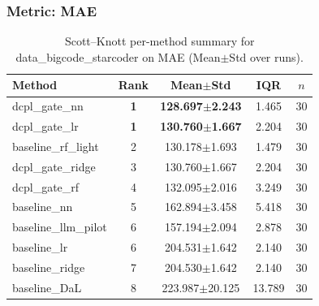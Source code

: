 \subsubsection*{Metric: MAE}
\begin{table}[H]
\centering
\scriptsize
\setlength{\tabcolsep}{4pt}
\renewcommand{\arraystretch}{1.1}
\caption{Scott--Knott per-method summary for data\_bigcode\_starcoder on MAE (Mean$\pm$Std over runs).}
\label{tab:sk_data_bigcode_starcoder_MAE}
\begin{tabular}{l|c|c|c|c}
\hline
\textbf{Method} & \textbf{Rank} & \textbf{Mean$\pm$Std} & \textbf{IQR} & \textbf{$n$} \\
\hline
\rowcolor{red!15} dcpl\_gate\_nn & \textbf{1} & \textbf{128.697$\pm$2.243} & 1.465 & 30 \\
\rowcolor{red!15} dcpl\_gate\_lr & \textbf{1} & \textbf{130.760$\pm$1.667} & 2.204 & 30 \\
baseline\_rf\_light & 2 & 130.178$\pm$1.693 & 1.479 & 30 \\
dcpl\_gate\_ridge & 3 & 130.760$\pm$1.667 & 2.204 & 30 \\
dcpl\_gate\_rf & 4 & 132.095$\pm$2.016 & 3.249 & 30 \\
baseline\_nn & 5 & 162.894$\pm$3.458 & 5.418 & 30 \\
baseline\_llm\_pilot & 6 & 157.194$\pm$2.094 & 2.878 & 30 \\
baseline\_lr & 6 & 204.531$\pm$1.642 & 2.140 & 30 \\
baseline\_ridge & 7 & 204.530$\pm$1.642 & 2.140 & 30 \\
baseline\_DaL & 8 & 223.987$\pm$20.125 & 13.789 & 30 \\
\hline
\end{tabular}
\end{table}

